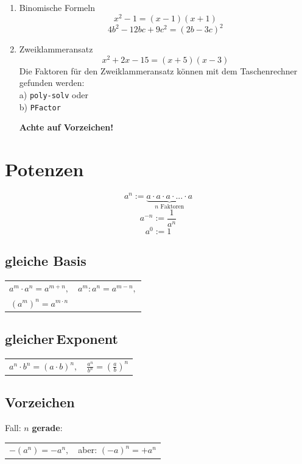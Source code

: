 \begin{multicols}{2}
\begin{enumerate}
\item Binomische Formeln
$$x^2-1 = (x-1)(x+1)$$
$$4b^2 -12bc + 9c^2=(2b-3c)^2$$
\item Zweiklammeransatz
$$x^2+2x-15 = (x+5)(x-3)$$
Die Faktoren für den Zweiklammeransatz können mit dem Taschenrechner
gefunden werden:\\ a) \texttt{poly-solv} 
oder\\ b) \texttt{PFactor} 

\textbf{\color{red}Achte auf Vorzeichen!}
\end{enumerate}




\forceCB
\section*{Potenzen}
\begin{tcolorbox}[colback=white]
$$a^n := \underbrace{a\cdot{}a\cdot{}a\cdot{}...\cdot{}a}_{n\textrm{ Faktoren}}$$
$$a^{-n} := \frac1{a^n}$$
  $$a^0 := 1$$
\end{tcolorbox}

\subsection*{gleiche Basis}
\begin{tabular}{cc}
$a^m\cdot{}a^n = a^{m+n},$ & $a^m:a^n=a^{m-n},$ \\
$\left(a^m\right)^n = a^{m\cdot{}n}$ &
 \end{tabular} 

\subsection*{gleicher\,Exponent}
\begin{tabular}{cc}
$a^n\cdot{}b^n = (a\cdot{}b)^n,$ & $\frac{a^n}{b^n} =\left(\frac{a}b\right)^n $
 \end{tabular}

\subsection*{Vorzeichen}
Fall: $n$ \textbf{gerade}:

\begin{tabular}{cc}
 $-(a^n) = -a^n,$ & aber: $(-a)^n = +a^n$
 \end{tabular} 


\end{multicols}
